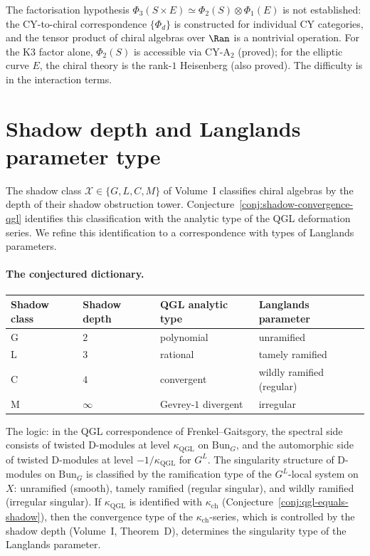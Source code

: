 The factorisation hypothesis $\Phi_3(S \times E) \simeq \Phi_2(S) \otimes \Phi_1(E)$ is not established: the CY-to-chiral correspondence $\{\Phi_d\}$ is constructed for individual CY categories, and the tensor product of chiral algebras over $\Ran$ is a nontrivial operation. For the K3 factor alone, $\Phi_2(S)$ is accessible via CY-A$_2$ (proved); for the elliptic curve $E$, the chiral theory is the rank-$1$ Heisenberg (also proved). The difficulty is in the interaction terms.


\section{Shadow depth and Langlands parameter type}
\label{sec:shadow-langlands-type}

The shadow class $\mathcal{X} \in \{G, L, C, M\}$ of Volume~I classifies chiral algebras by the depth of their shadow obstruction tower. Conjecture~\ref{conj:shadow-convergence-qgl} identifies this classification with the analytic type of the QGL deformation series. We refine this identification to a correspondence with types of Langlands parameters.

\paragraph{The conjectured dictionary.}
\begin{center}
\begin{tabular}{llll}
Shadow class & Shadow depth & QGL analytic type & Langlands parameter \\
\hline
G & $2$ & polynomial & unramified \\
L & $3$ & rational & tamely ramified \\
C & $4$ & convergent & wildly ramified (regular) \\
M & $\infty$ & Gevrey-$1$ divergent & irregular \\
\end{tabular}
\end{center}

\noindent The logic: in the QGL correspondence of Frenkel--Gaitsgory, the spectral side consists of twisted D-modules at level $\kappa_{\mathrm{QGL}}$ on $\mathrm{Bun}_G$, and the automorphic side of twisted D-modules at level $-1/\kappa_{\mathrm{QGL}}$ for $G^L$. The singularity structure of D-modules on $\mathrm{Bun}_G$ is classified by the ramification type of the $G^L$-local system on $X$: unramified (smooth), tamely ramified (regular singular), and wildly ramified (irregular singular). If $\kappa_{\mathrm{QGL}}$ is identified with $\kappa_{\mathrm{ch}}$ (Conjecture~\ref{conj:qgl-equals-shadow}), then the convergence type of the $\kappa_{\mathrm{ch}}$-series, which is controlled by the shadow depth (Volume~I, Theorem~D), determines the singularity type of the Langlands parameter.


